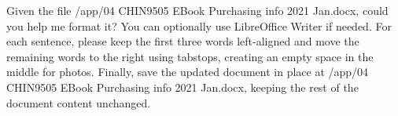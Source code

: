 \documentclass{llmxive}
\begin{document}
\begin{instructionbox}
Given the file \textasciigrave{}/app/04 CHIN9505 EBook Purchasing info 2021 Jan.docx\textasciigrave{}, could you help me format it? You can optionally use LibreOffice Writer if needed. For each sentence, please keep the first three words left-aligned and move the remaining words to the right using tabstops, creating an empty space in the middle for photos. Finally, save the updated document in place at \textasciigrave{}/app/04 CHIN9505 EBook Purchasing info 2021 Jan.docx\textasciigrave{}, keeping the rest of the document content unchanged.
\end{instructionbox}
\end{document}
